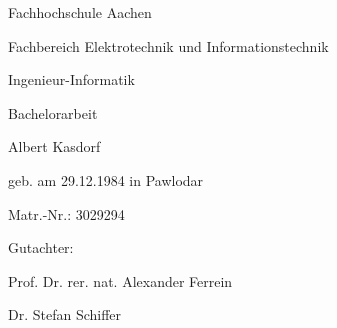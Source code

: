 %
%
% 
\begin{titlepage}
	\newlength
	\logoheight
	\settoheight
	\thispagestyle{empty}

	\vspace*{\fill}
	\centering
	\normalsize
	Fachhochschule Aachen\par
	Fachbereich Elektrotechnik und Informationstechnik\par
	Ingenieur-Informatik\par
	\vspace{0.5cm}
	Bachelorarbeit\par
	\Huge
	\thetitle\par
	\normalsize
	\vspace{0.5cm}
	Albert Kasdorf\par
	geb. am 29.12.1984 in Pawlodar\par
	Matr.-Nr.: 3029294\par
	\vspace{0.5cm}
	Gutachter:\par
	Prof. Dr. rer. nat. Alexander Ferrein\par
	Dr. Stefan Schiffer\par
	\vspace{\fill}
\end{titlepage}